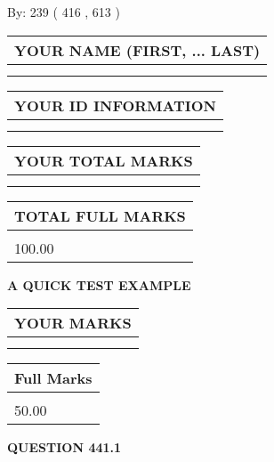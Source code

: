 \documentclass[12pt]{article}
\begin{document}
   
\hspace{1.0in} By: 
 239 ( 416 ,  613 )
   
   
   
   
\newpage 
\setcounter{page}{ 
   441001 } 
   
   
   
   
\noindent\begin{tabular}{|l|}
\hline
YOUR NAME (FIRST, ... LAST)  \\
\hline
 \\ 
 \\ 
\hline
\end{tabular}
\hspace{0.05in} \begin{tabular}{|l|}
\hline
 YOUR   ID   INFORMATION  \\
\hline
 \\ 
 \\ 
\hline
\end{tabular}
   
   
\vspace{0.2in}\noindent\begin{tabular}{|l|}
\hline
YOUR TOTAL MARKS  \\
\hline
 \\ 
 \\ 
\hline
\end{tabular}
\hspace{0.05in} \begin{tabular}{|l|}
\hline
TOTAL FULL MARKS  \\
\hline
 \\ 
100.00 \\
\hline
\end{tabular}
   
   
 \vspace{0.2in}
{\LARGE {\textbf{ A QUICK TEST EXAMPLE}}}
   
   
  
\vspace{0.2in}
  
\noindent\begin{tabular}{|l|}
\hline
 YOUR MARKS  \\
\hline
 \\ 
 \\ 
\hline
\end{tabular}
\hspace{0.05in} \begin{tabular}{|l|}
\hline
 Full Marks  \\
\hline
 \\ 
50.00 \\
\hline
\end{tabular}
{\textbf{\Large{QUESTION
441.1 
}}}
  
\end{document}
